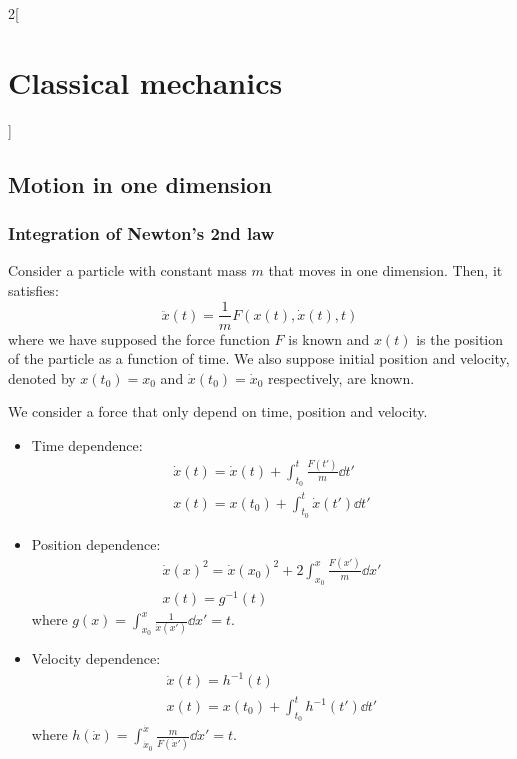 \documentclass[../../../main.tex]{subfiles}
\begin{document}
\begin{multicols}{2}[\section{Classical mechanics}]
    \subsection{Motion in one dimension}
    \subsubsection*{Integration of Newton's 2nd law}
    \begin{prop}
        Consider a particle with constant mass $m$ that moves in one dimension. Then, it satisfies: $$\ddot{x}(t)=\frac{1}{m}F(x(t),\dot{x}(t),t)$$
        where we have supposed the force function $F$ is known and $x(t)$ is the position of the particle as a function of time. We also suppose initial position and velocity, denoted by $x(t_0)=x_0$ and $\dot{x}(t_0)=\dot{x}_0$ respectively, are known.
    \end{prop}
    \begin{prop}
        We consider a force that only depend on time, position and velocity.
        \begin{itemize}
            \item Time dependence:
                  \begin{gather*}
                      \dot{x}(t)=\dot{x}(t)+\int_{t_0}^t\frac{F(t')}{m}\dd t'\\
                      x(t)=x(t_0)+\int_{t_0}^t\dot{x}(t')\dd t'
                  \end{gather*}
            \item Position dependence:
                  \begin{gather*}
                      {\dot{x}(x)}^2={\dot{x}(x_0)}^2+2\int_{x_0}^x\frac{F(x')}{m}\dd x'\\
                      x(t)=g^{-1}(t)
                  \end{gather*}
                  where $\displaystyle g(x)=\int_{x_0}^x\frac{1}{\dot{x}(x')}\dd x'=t$.
            \item Velocity dependence:
                  \begin{gather*}
                      \dot{x}(t)=h^{-1}(t)\\
                      x(t)=x(t_0)+\int_{t_0}^th^{-1}(t')\dd t'
                  \end{gather*}
                  where $\displaystyle h(\dot{x})=\int_{\dot{x}_0}^{\dot{x}}\frac{m}{F(\dot{x}')}\dd\dot{x}'=t$.
        \end{itemize}
    \end{prop}

\end{multicols}
\end{document}
